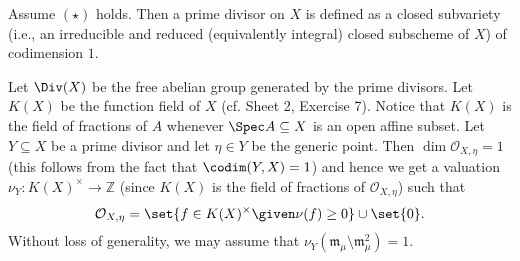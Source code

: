 Assume $(\star)$ holds. Then a prime divisor on $X$ is defined as a closed subvariety
(i.e., an irreducible and reduced (equivalently integral) closed subscheme of $X$)
of codimension $1$.

Let $\Div(X)$ be the free abelian group generated by the prime divisors. Let
$K(X)$ be the function field of $X$ (cf. Sheet 2, Exercise 7). Notice that
$K(X)$ is the field of fractions of $A$ whenever $\Spec A \subseteq X$ is an
open affine subset. Let $Y \subseteq X$ be a prime divisor and let $\eta \in Y$
be the generic point. Then $\dim \mathcal{O}_{X, \eta} = 1$ (this follows from
the fact that $\codim(Y, X) = 1$) and hence we get a valuation
$\nu_Y\colon K(X)^\times \to \mathbb{Z}$ (since $K(X)$ is the field of fractions of
$\mathcal{O}_{X, \eta}$) such that
\[ \mathcal{O}_{X, \eta} = \set{f \in K(X)^\times\given \nu(f)\geq 0}\cup\set{0}. \]
Without loss of generality, we may assume that $\nu_Y(\mathfrak{m}_\mu\setminus \mathfrak{m}_\mu^2) = 1$.
